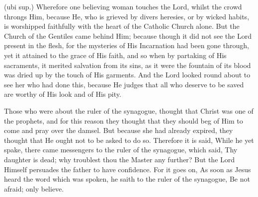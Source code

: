  (ubi sup.) Wherefore one believing woman touches the Lord, whilst the crowd throngs Him, because He, who is grieved by divers heresies, or by wicked habits, is worshipped faithfully with the heart of the Catholic Church alone. But the Church of the Gentiles came behind Him; because though it did not see the Lord present in the flesh, for the mysteries of His Incarnation had been gone through, yet it attained to the grace of His faith, and so when by partaking of His sacraments, it merited salvation from its sins, as it were the fountain of its blood was dried up by the touch of His garments. And the Lord looked round about to see her who had done this, because He judges that all who deserve to be saved are worthy of His look and of His pity.

 

 Those who were about the ruler of the synagogue, thought that Christ was one of the prophets, and for this reason they thought that they should beg of Him to come and pray over the damsel. But because she had already expired, they thought that He ought not to be asked to do so. Therefore it is said, While he yet spake, there came messengers to the ruler of the synagogue, which said, Thy daughter is dead; why troublest thou the Master any further? But the Lord Himself persuades the father to have confidence. For it goes on, As soon as Jesus heard the word which was spoken, he saith to the ruler of the synagogue, Be not afraid; only believe.

